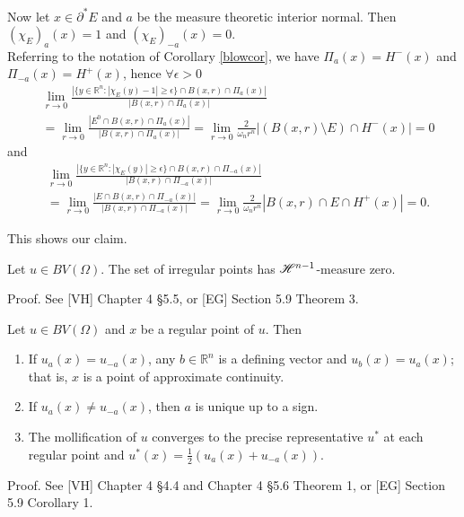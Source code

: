 \begin{example}
Now let $x \in \partial^{*}E$ and $a$ be the measure theoretic interior normal. Then $(\chi_{E})_{a}(x) = 1$ and $(\chi_{E})_{-a}(x) = 0$.
\\
Referring to the notation of Corollary \ref{blowcor}, we have $\Pi_{a}(x) = H^{-}(x)$ and \\
$\Pi_{-a}(x) = H^{+}(x)$, hence $\forall \epsilon > 0$
\begin{align*} & \lim_{r \to 0} \frac{|\{y \in \mathbb{R}^{n} : |\chi_{E}(y) - 1| \ge \epsilon \} \cap B(x,r) \cap \Pi_{a}(x)|}{|B(x, r) \cap \Pi_{a}(x)|} \\
&= \lim_{r \to 0} \frac{|E^{0} \cap B(x, r) \cap \Pi_{a}(x)|}{|B(x, r) \cap \Pi_{a}(x)|}  = \lim_{r \to 0} \frac{2}{\omega_{n} r^{n}} | (B(x, r) \setminus E ) \cap H^{-}(x)| = 0
\end{align*}
and
\begin{align*} & \lim_{r \to 0} \frac{|\{y \in \mathbb{R}^{n} : |\chi_{E}(y)| \ge \epsilon \} \cap B(x,r) \cap \Pi_{-a}(x)|}{|B(x, r) \cap \Pi_{-a}(x)|} \\ 
&= \lim_{r \to 0} \frac{|E \cap B(x, r) \cap \Pi_{-a}(x)|}{|B(x, r) \cap \Pi_{-a}(x)|} = \lim_{r \to 0} \frac{2}{\omega_{n} r^{n}} | B(x, r) \cap E \cap H^{+}(x)| = 0.
\end{align*}

This shows our claim.

\end{example}



\begin{theorem} \label{irregularpoints} Let $u \in BV(\Omega)$. The set of irregular points has $\mathscr{H}^{n-1}$-measure zero.
\end{theorem}

Proof. See [VH] Chapter 4 §5.5, or [EG] Section 5.9 Theorem 3.

\begin{theorem} \label{regularpoints} Let $u \in BV(\Omega)$ and $x$ be a regular point of $u$. Then
\begin{enumerate}
	\item If $u_{a}(x) = u_{-a}(x)$, any $b \in \mathbb{R}^{n}$ is a defining vector and $u_{b}(x) = u_{a}(x)$; that is, $x$ is a point of approximate continuity. 
	\item If $u_{a}(x) \neq u_{-a}(x)$, then $a$ is unique up to a sign.
	\item The mollification of $u$ converges to the precise representative $u^{*}$ at each regular point and $u^{*}(x) = \frac{1}{2} (u_{a}(x) + u_{-a}(x) )$.
\end{enumerate}
\end{theorem}
Proof. See [VH] Chapter 4 §4.4 and Chapter 4 §5.6 Theorem 1, or [EG] Section 5.9 Corollary 1.

